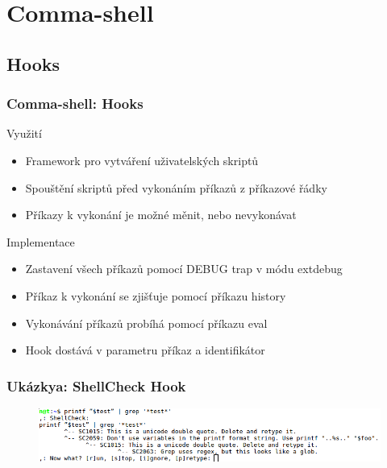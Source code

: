 \documentclass{beamer}
\begin{document}

\section{Comma-shell}


\subsection{Hooks}
\begin{frame}
	\frametitle{Comma-shell: Hooks}
	
	\begin{exampleblock}{Využití}
		\begin{itemize}
			\item Framework pro vytváření uživatelských skriptů
			\item Spouštění skriptů před vykonáním příkazů z příkazové řádky
			\item Příkazy k vykonání je možné měnit, nebo nevykonávat
		\end{itemize}
	\end{exampleblock}	
	
	\begin{exampleblock}{Implementace}
		\begin{itemize}
			\item Zastavení všech příkazů pomocí DEBUG trap v módu extdebug
			\item Příkaz k vykonání se zjišťuje pomocí příkazu history
			\item Vykonávání příkazů probíhá pomocí příkazu eval
			\item Hook dostává v parametru příkaz a identifikátor
		\end{itemize}
	\end{exampleblock}
\end{frame}


\begin{frame}
	\frametitle{Ukázkya: ShellCheck Hook}
	\begin{figure}
		\centering
		\includegraphics[width=1.0\textwidth]{./images/shellcheck}
	\end{figure}	
\end{frame}
\end{document}
